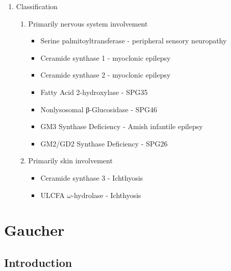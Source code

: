 \documentclass{scrartcl}
\begin{document}
\begin{enumerate}
\item Classification
\label{sec:org353fd33}

\begin{enumerate}
\item Primarily nervous system involvement
\label{sec:orgc70bd29}
\begin{itemize}
\item Serine palmitoyltransferase - peripheral sensory neuropathy
\item Ceramide synthase 1 - myoclonic epilepsy
\item Ceramide synthase 2 - myoclonic epilepsy
\item Fatty Acid 2-hydroxylase - SPG35
\item Nonlysosomal β-Glucosidase - SPG46
\item GM3 Synthase Deficiency - Amish infantile epilepsy
\item GM2/GD2 Synthase Deficiency - SPG26
\end{itemize}


\item Primarily skin involvement
\label{sec:org0aa9a6f}
\begin{itemize}
\item Ceramide synthase 3 - Ichthyosis
\item ULCFA \(\omega\)-hydrolase - Ichthyosis
\end{itemize}
\end{enumerate}
\end{enumerate}

\section{Gaucher}
\label{sec:orgd5b93ca}
\subsection{Introduction}
\label{sec:org81b4be9}
\end{document}
